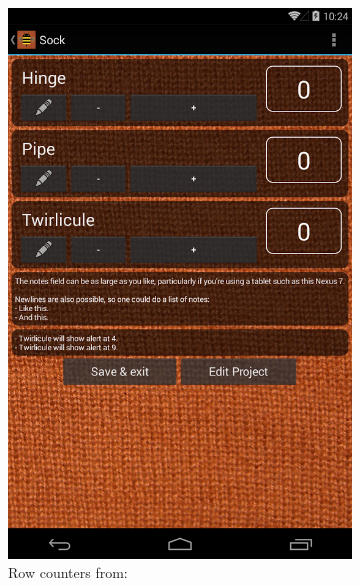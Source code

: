 \begin{figure}[H]
  \centering
    \begin{subfigure}[b]{0.4\textwidth}
      \centering
        \includegraphics[width=0.95\linewidth]{images/image01.png}
        \caption[Row counters ]{Row counters from: \protect\cite{beecounter_row_counters}}
    \end{subfigure}
    \begin{subfigure}[b]{0.4\textwidth}
      \centering

\end{subfigure}
\end{figure}
